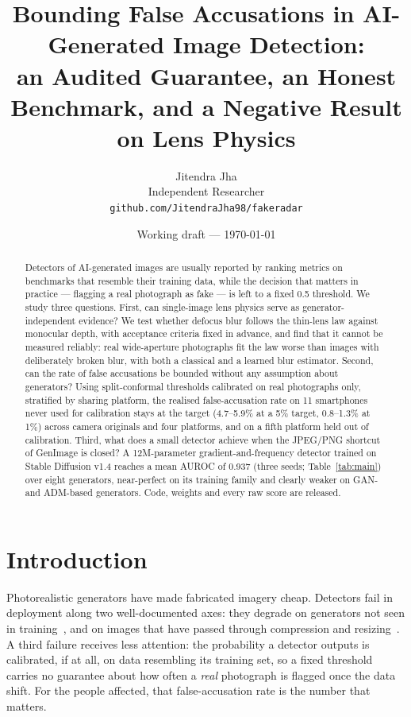 \documentclass[10pt,twocolumn]{article}
\title{\textbf{Bounding False Accusations in AI-Generated Image Detection:\\
an Audited Guarantee, an Honest Benchmark, and a Negative Result on Lens Physics}}
\author{Jitendra Jha\\
\small Independent Researcher\\
\small \texttt{github.com/JitendraJha98/fakeradar}}
\date{Working draft --- \today}
\begin{document}
\maketitle

\begin{abstract}
Detectors of AI-generated images are usually reported by ranking metrics on
benchmarks that resemble their training data, while the decision that matters
in practice --- flagging a real photograph as fake --- is left to a fixed 0.5
threshold. We study three questions. First, can single-image lens physics
serve as generator-independent evidence? We test whether defocus blur follows
the thin-lens law against monocular depth, with acceptance criteria fixed in
advance, and find that it cannot be measured reliably: real wide-aperture
photographs fit the law worse than images with deliberately broken blur, with
both a classical and a learned blur estimator. Second, can the rate of false
accusations be bounded without any assumption about generators? Using
split-conformal thresholds calibrated on real photographs only, stratified by
sharing platform, the realised false-accusation rate on 11 smartphones never
used for calibration stays at the target (4.7--5.9\% at a 5\% target,
0.8--1.3\% at 1\%) across camera originals and four platforms, and on a fifth
platform held out of calibration. Third, what does a small detector achieve
when the JPEG/PNG shortcut of GenImage is closed? A 12M-parameter
gradient-and-frequency detector trained on Stable Diffusion v1.4 reaches a
mean AUROC of 0.937 (three seeds; Table~\ref{tab:main}) over
eight generators, near-perfect on its training family and clearly weaker on
GAN- and ADM-based generators. Code, weights and every raw
score are released.
\end{abstract}

\section{Introduction}
Photorealistic generators have made fabricated imagery cheap. Detectors fail
in deployment along two well-documented axes: they degrade on generators not
seen in training~\cite{wang2020cnn,zhu2023genimage}, and on images that have
passed through compression and resizing~\cite{gragnaniello2021gan,corvi2023detection}.
A third failure receives less attention: the probability a detector outputs
is calibrated, if at all, on data resembling its training set, so a fixed
threshold carries no guarantee about how often a \emph{real} photograph is
flagged once the data shift. For the people affected, that false-accusation
rate is the number that matters.
\end{document}
